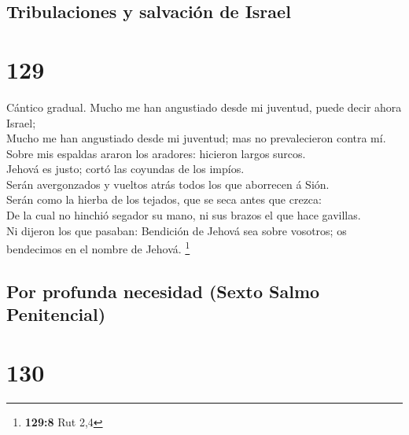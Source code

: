 \hypertarget{tribulaciones-y-salvaciuxf3n-de-israel}{%
\subsection{Tribulaciones y salvación de
Israel}\label{tribulaciones-y-salvaciuxf3n-de-israel}}

\hypertarget{section-128}{%
\section{129}\label{section-128}}

 Cántico gradual. Mucho me han angustiado desde mi
juventud, puede decir ahora Israel;\\
 Mucho me han angustiado desde mi juventud; mas no
prevalecieron contra mí.\\
 Sobre mis espaldas araron los aradores: hicieron largos
surcos.\\
 Jehová es justo; cortó las coyundas de los impíos.\\
 Serán avergonzados y vueltos atrás todos los que
aborrecen á Sión.\\
 Serán como la hierba de los tejados, que se seca antes
que crezca:\\
 De la cual no hinchió segador su mano, ni sus brazos el
que hace gavillas.\\
 Ni dijeron los que pasaban: Bendición de Jehová sea sobre
vosotros; os bendecimos en el nombre de Jehová. \footnote{\textbf{129:8}
  Rut 2,4}

\hypertarget{por-profunda-necesidad-sexto-salmo-penitencial}{%
\subsection{Por profunda necesidad (Sexto Salmo
Penitencial)}\label{por-profunda-necesidad-sexto-salmo-penitencial}}

\hypertarget{section-129}{%
\section{130}\label{section-129}}

